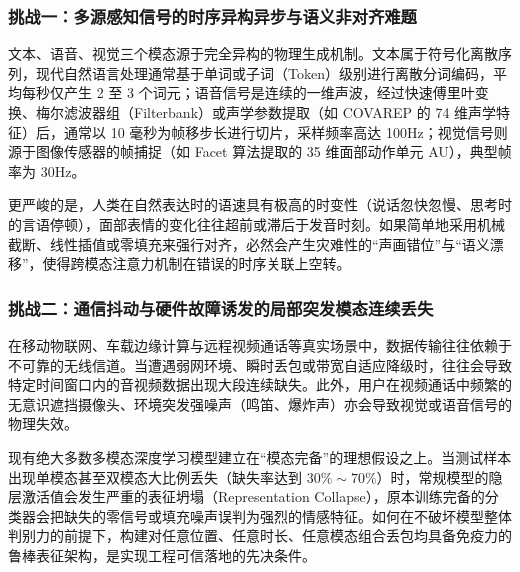 \subsubsection{挑战一：多源感知信号的时序异构异步与语义非对齐难题}
文本、语音、视觉三个模态源于完全异构的物理生成机制。文本属于符号化离散序列，现代自然语言处理通常基于单词或子词（Token）级别进行离散分词编码，平均每秒仅产生 2 至 3 个词元；语音信号是连续的一维声波，经过快速傅里叶变换、梅尔滤波器组（Filterbank）或声学参数提取（如 COVAREP 的 74 维声学特征）后，通常以 10 毫秒为帧移步长进行切片，采样频率高达 100Hz；视觉信号则源于图像传感器的帧捕捉（如 Facet 算法提取的 35 维面部动作单元 AU），典型帧率为 30Hz。

更严峻的是，人类在自然表达时的语速具有极高的时变性（说话忽快忽慢、思考时的言语停顿），面部表情的变化往往超前或滞后于发音时刻。如果简单地采用机械截断、线性插值或零填充来强行对齐，必然会产生灾难性的“声画错位”与“语义漂移”，使得跨模态注意力机制在错误的时序关联上空转。

\subsubsection{挑战二：通信抖动与硬件故障诱发的局部突发模态连续丢失}
在移动物联网、车载边缘计算与远程视频通话等真实场景中，数据传输往往依赖于不可靠的无线信道。当遭遇弱网环境、瞬时丢包或带宽自适应降级时，往往会导致特定时间窗口内的音视频数据出现大段连续缺失。此外，用户在视频通话中频繁的无意识遮挡摄像头、环境突发强噪声（鸣笛、爆炸声）亦会导致视觉或语音信号的物理失效。

现有绝大多数多模态深度学习模型建立在“模态完备”的理想假设之上。当测试样本出现单模态甚至双模态大比例丢失（缺失率达到 $30\%\sim 70\%$）时，常规模型的隐层激活值会发生严重的表征坍塌（Representation Collapse），原本训练完备的分类器会把缺失的零信号或填充噪声误判为强烈的情感特征。如何在不破坏模型整体判别力的前提下，构建对任意位置、任意时长、任意模态组合丢包均具备免疫力的鲁棒表征架构，是实现工程可信落地的先决条件。

